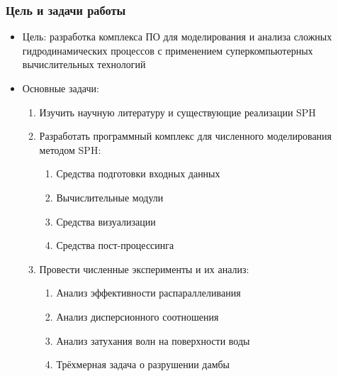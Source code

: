 \begin{frame}
    \frametitle{Цель и задачи работы}
    \begin{itemize}
        \item Цель: разработка комплекса ПО для моделирования и 
        анализа сложных гидродинамических процессов с применением суперкомпьютерных вычислительных технологий
        \item Основные задачи:
        \begin{enumerate}
            \item Изучить научную литературу и существующие реализации SPH
            \item Разработать программный комплекс для численного моделирования методом SPH:
            \begin{enumerate}
                \item Средства подготовки входных данных
                \item Вычислительные модули
                \item Средства визуализации
                \item Средства пост-процессинга
            \end{enumerate}
            \item Провести численные эксперименты и их анализ:
            \begin{enumerate}
                \item Анализ эффективности распараллеливания
                \item Анализ дисперсионного соотношения
                \item Анализ затухания волн на поверхности воды
                \item Трёхмерная задача о разрушении дамбы
            \end{enumerate}
        \end{enumerate}
    \end{itemize}
\end{frame}
